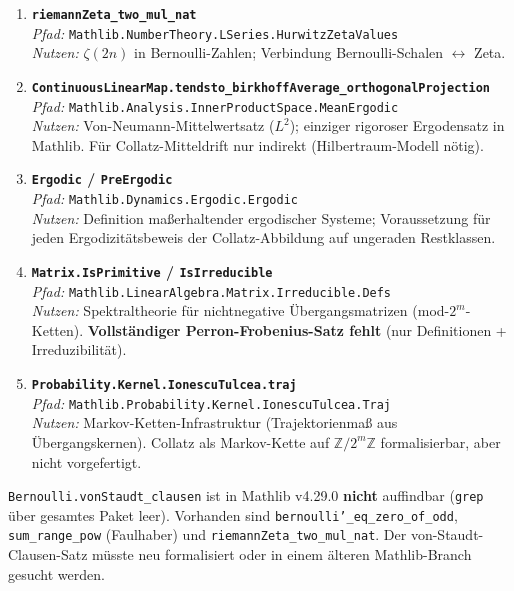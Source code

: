 \documentclass[12pt,a4paper]{article}
\newcommand{\Mathlib}[1]{\texttt{Mathlib.\allowbreak #1}}
\begin{document}
\begin{enumerate}[label=\textbf{\arabic*.}]
\item \textbf{\texttt{riemannZeta\_two\_mul\_nat}}\\
\textit{Pfad:} \Mathlib{NumberTheory.LSeries.HurwitzZetaValues}\\
\textit{Nutzen:} $\zeta(2n)$ in Bernoulli-Zahlen; Verbindung Bernoulli-Schalen $\leftrightarrow$ Zeta.

\item \textbf{\texttt{ContinuousLinearMap.tendsto\_birkhoffAverage\_orthogonalProjection}}\\
\textit{Pfad:} \Mathlib{Analysis.InnerProductSpace.MeanErgodic}\\
\textit{Nutzen:} Von-Neumann-Mittelwertsatz ($L^2$); einziger rigoroser Ergodensatz in Mathlib.
Für Collatz-Mitteldrift nur indirekt (Hilbertraum-Modell nötig).

\item \textbf{\texttt{Ergodic} / \texttt{PreErgodic}}\\
\textit{Pfad:} \Mathlib{Dynamics.Ergodic.Ergodic}\\
\textit{Nutzen:} Definition maßerhaltender ergodischer Systeme; Voraussetzung für jeden
Ergodizitätsbeweis der Collatz-Abbildung auf ungeraden Restklassen.

\item \textbf{\texttt{Matrix.IsPrimitive} / \texttt{IsIrreducible}}\\
\textit{Pfad:} \Mathlib{LinearAlgebra.Matrix.Irreducible.Defs}\\
\textit{Nutzen:} Spektraltheorie für nichtnegative Übergangsmatrizen (mod-$2^m$-Ketten).
\textbf{Vollständiger Perron-Frobenius-Satz fehlt} (nur Definitionen + Irreduzibilität).

\item \textbf{\texttt{Probability.Kernel.IonescuTulcea.traj}}\\
\textit{Pfad:} \Mathlib{Probability.Kernel.IonescuTulcea.Traj}\\
\textit{Nutzen:} Markov-Ketten-Infrastruktur (Trajektorienmaß aus Übergangskernen).
Collatz als Markov-Kette auf $\mathbb{Z}/2^m\mathbb{Z}$ formalisierbar, aber nicht vorgefertigt.

\end{enumerate}

\begin{tcolorbox}[warnung,title={Korrektur zur Vorgänger-Recherche}]
\texttt{Bernoulli.vonStaudt\_clausen} ist in Mathlib v4.29.0 \textbf{nicht} auffindbar
(\texttt{grep} über gesamtes Paket leer). Vorhanden sind
\texttt{bernoulli'\_eq\_zero\_of\_odd}, \texttt{sum\_range\_pow} (Faulhaber) und
\texttt{riemannZeta\_two\_mul\_nat}. Der von-Staudt-Clausen-Satz müsste neu formalisiert
oder in einem älteren Mathlib-Branch gesucht werden.
\end{tcolorbox}
\end{document}
